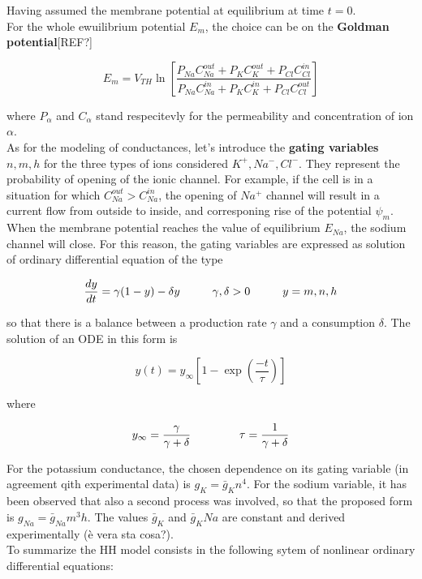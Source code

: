 \documentclass[a4paper]{article}
\begin{document}
Having assumed the membrane potential at equilibrium at time $t=0$.\\
For the whole ewuilibrium potential $E_m$, the choice can be on the \textbf{Goldman potential}[REF?]


\begin{equation}
E_m= V_{TH} \ln \left[\frac{P_{Na} C_{Na}^{out} + P_{K} C_K^{out} + P_{Cl} C_{Cl}^{in}}{P_{Na} C_{Na}^{in} + P_{K} C_K^{in} + P_{Cl} C_{Cl}^{out}}\right]
\end{equation}

where $P_\alpha$ and $C_\alpha$ stand respecitevly for the permeability and concentration of ion $\alpha$.\\
As for the modeling of conductances, let's introduce the \textbf{gating variables} $n,m,h$ for the three types of ions considered $K^+,Na^-,Cl^-$. They represent the probability of opening of the ionic channel. For example, if the cell is in a situation for which $C_{Na}^{out} > C_{Na}^{in}$, the opening of $Na^+$ channel will result in a current flow from outside to inside, and corresponing rise of the potential $\psi_m$. When the membrane potential reaches the value of equilibrium $E_{Na}$, the sodium channel will close. For this reason, the gating variables are expressed as solution of ordinary differential equation of the type

\begin{equation}
\frac{dy}{dt} = \gamma (1-y) - \delta y \hspace{1 cm} \gamma,\delta >0  \hspace{1 cm} y = m,n,h
\end{equation}

so that there is a balance between a production rate $\gamma$ and a consumption $\delta$. The solution of an ODE in this form is

\begin{equation}
y(t) = y_\infty \left[1 - \exp\left(\frac{-t}{\tau}\right)\right]
\end{equation}

where

\begin{equation}
y_\infty = \frac{\gamma}{\gamma + \delta} \hspace{1.5cm} \tau = \frac{1}{\gamma + \delta}
\end{equation}

For the potassium conductance, the chosen dependence on its gating variable (in agreement qith experimental data) is $ g_K = \bar{g}_K n^4$. For the sodium variable, it has been observed that also a second process was involved, so that the proposed form is  $ g_{Na} = \bar{g}_{Na} m^3h$. The values $\bar{g}_K$ and $\bar{g}_K{Na}$ are constant and derived experimentally (è vera sta cosa?).\\
To summarize the HH model consists in the following sytem of nonlinear ordinary differential equations:
\end{document}
